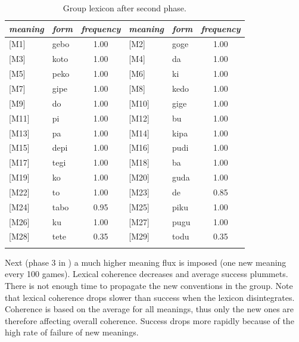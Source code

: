 \begin{table}
\begin{center}
\begin{tabular}{ l  l  c  l  l  c } \lsptoprule 
{\itshape meaning} & {\itshape form} & {\itshape frequency} & {\itshape meaning} & {\itshape form} & {\itshape frequency}\\ \midrule 
{}[M1]& gebo & 1.00 & [M2]& goge & 1.00 \\  
{}[M3]& koto & 1.00 & [M4]& da & 1.00 \\  
{}[M5]& peko & 1.00 & [M6]& ki & 1.00 \\  
{}[M7]& gipe & 1.00 & [M8]& kedo & 1.00 \\  
{}[M9]& do & 1.00 & [M10]& gige & 1.00 \\  
{}[M11]& pi & 1.00 & [M12]& bu & 1.00 \\  
{}[M13]& pa & 1.00 & [M14]& kipa & 1.00 \\  
{}[M15]& depi & 1.00 & [M16]& pudi & 1.00 \\  
{}[M17]& tegi & 1.00 & [M18]& ba & 1.00 \\  
{}[M19]& ko & 1.00 & [M20]& guda & 1.00 \\  
{}[M22]& to & 1.00 & [M23]& de & 0.85 \\  
{}[M24]& tabo & 0.95 & [M25]& piku & 1.00 \\  
{}[M26]& ku & 1.00 & [M27]& pugu & 1.00 \\  
{}[M28]& tete & 0.35 & [M29]& todu & 0.35 \\  
\lspbottomrule
\end{tabular}
\caption{\label{tab:phase1}Group lexicon after second phase.}
\end{center}
\end{table}
Next (phase 3 in ) a much higher 
meaning flux is imposed (one new meaning every 100 games). 
Lexical coherence decreases and
average success plummets. There is not enough time to propagate
the new conventions in the group. 
Note that lexical coherence drops slower than 
success when the lexicon disintegrates. 
Coherence is based on the average for all 
meanings, thus only the new ones are therefore affecting overall coherence. 
Success drops more rapidly 
because of the high rate of failure of new meanings. 


